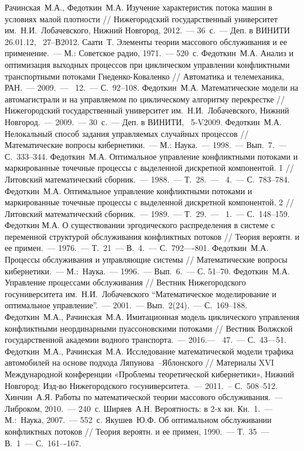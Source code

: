 \documentclass{report}
\newcommand{\No}{\textnumero}
\begin{document}
\begin{thebibliography}{99}
 Рачинская~М.А., Федоткин~М.А. Изучение характеристик потока машин в условиях малой плотности // Нижегородский государственный университет им.~Н.И.~Лобачевского, Нижний Новгород, 2012.~--- 36~с.~--- Деп. в ВИНИТИ 26.01.12, \No{}~27--В2012.
 Саати~Т. Элементы теории массового обслуживания и ее применение.~--- М.: Советское радио, 1971.~--- 520~с.
 Федоткин~М.А. Анализ и оптимизация выходных процессов при циклическом управлении конфликтными транспортными потоками Гнеденко-Коваленко  // Автоматика и телемеханика, РАН.~--- 2009.~--- \No{}~12.~--- С.~92--108.
 Федоткин~М.А. Математические модели на автомагистрали и на управляемом по циклическому алгоритму перекрестке // Нижегородский государственный университет им.~Н.И.~Лобачевского, Нижний Новгород.~--- 2009.~--- 30~с.~--- Деп. в ВИНИТИ, \No{}~5-V2009.
 Федоткин~М.А. Нелокальный способ задания управляемых случайных процессов // Математические вопросы кибернетики.~--- М.: Наука.~--- 1998.~--- Вып.~7.~--- С.~333--344.
 Федоткин~М.А. Оптимальное управление конфликтными потоками и маркированные точечные процессы с выделенной дискретной компонентой. 1 // Литовский математический сборник.~--- 1988.~--- Т.~28.~--- \No{}~4.~--- С.~783--784.
 Федоткин~М.А. Оптимальное управление конфликтными потоками и маркированные точечные процессы с выделенной дискретной компонентой. 2 // Литовский математический сборник.~--- 1989.~--- Т.~29.~--- \No{}~1.~--- С.~148--159.
 Федоткин М.А. О существовании эргодического распределения в системе с переменной структурой обслуживания конфликтных потоков // Теория вероятн. и ее примен.~--- 1976.~--- Т.~21~--- В.~4.~--- С.~792—-801.
 Федоткин~М.А. Процессы обслуживания и управляющие системы // Математические вопросы кибернетики.~--- М.:~Наука.~--- 1996.~--- Вып.~6.~--- С. 51--70.
 Федоткин~М.А. Управление процессами обслуживания // Вестник Нижегородского госуниверситета им.~Н.И.~Лобачевского “Математическое моделирование и оптимальное управление”.~--- 2001.~--- Вып.~2(24).~--- С.~169--188.
 Федоткин~М.А., Рачинская~М.А. Имитационная модель циклического управления конфликтными неординарными пуассоновскими потоками // Вестник Волжской государственной академии водного транспорта.~---
2016.--- \No{}~47.~--- С.~43---51.
 Федоткин~М.А., Рачинская~М.А. Исследование математической модели трафика автомобилей на основе подхода Ляпунова~--Яблонского // Материалы XVI Международной конференции «Проблемы теоретической кибернетики», Нижний Новгород: Изд-во Нижегородского госуниверситета.~--- 2011.~-- С.~508--512.
 Хинчин~А.Я. Работы по математической теории массового обслуживания.~--- Либроком, 2010.~--- 240~с.
 Ширяев~А.Н. Вероятность: в 2-х кн. Кн.~1.~--- М.:~Наука, 2007.~--- 552~с.
 Якушев~Ю.Ф. Об оптимальном обслуживании конфликтных потоков //  Теория вероятн. и ее примен, 1990.~--- Т.~35~--- В.~1~--- С.~161–-167.





\end{thebibliography}
\end{document}
